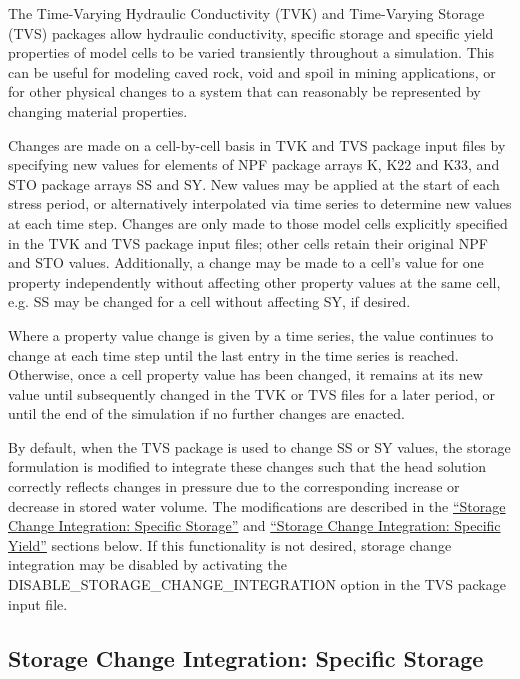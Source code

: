 
The \mf Time-Varying Hydraulic Conductivity (TVK) and Time-Varying Storage (TVS) packages allow hydraulic conductivity, specific storage and specific yield properties of model cells to be varied transiently throughout a simulation. This can be useful for modeling caved rock, void and spoil in mining applications, or for other physical changes to a system that can reasonably be represented by changing material properties.

Changes are made on a cell-by-cell basis in TVK and TVS package input files by specifying new values for elements of NPF package arrays K, K22 and K33, and STO package arrays SS and SY. New values may be applied at the start of each stress period, or alternatively interpolated via time series to determine new values at each time step. Changes are only made to those model cells explicitly specified in the TVK and TVS package input files; other cells retain their original NPF and STO values. Additionally, a change may be made to a cell's value for one property independently without affecting other property values at the same cell, e.g. SS may be changed for a cell without affecting SY, if desired.

Where a property value change is given by a time series, the value continues to change at each time step until the last entry in the time series is reached. Otherwise, once a cell property value has been changed, it remains at its new value until subsequently changed in the TVK or TVS files for a later period, or until the end of the simulation if no further changes are enacted.

By default, when the TVS package is used to change SS or SY values, the \mf storage formulation is modified to integrate these changes such that the head solution correctly reflects changes in pressure due to the corresponding increase or decrease in stored water volume. The modifications are described in the \hyperref[sec:sci-ss]{``Storage Change Integration: Specific Storage''} and \hyperref[sec:sci-sy]{``Storage Change Integration: Specific Yield''} sections below. If this functionality is not desired, storage change integration may be disabled by activating the DISABLE\_STORAGE\_CHANGE\_INTEGRATION option in the TVS package input file.



\subsection{Storage Change Integration: Specific Storage} \label{sec:sci-ss}

